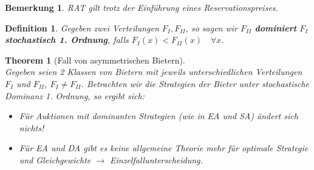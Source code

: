 \documentclass[12pt]{extreport} %
\theoremstyle{named}
\newtheorem{unnamedtheorem}{Theorem} \counterwithin{unnamedtheorem}{chapter}
\theoremstyle{itshape}
\newtheorem*{definition}{Definition}
\theoremstyle{normal}
\newtheorem*{bemerkung}{Bemerkung}
\begin{document}
\begin{bemerkung}
	RAT gilt trotz der Einführung eines Reservationspreises.
\end{bemerkung}

\begin{definition}
	Gegeben zwei Verteilungen $F_{I}, F_{II}$, so sagen wir $F_{II}$ \textbf{dominiert} $F_{I}$ \textbf{stochastisch 1. Ordnung}, falls $F_{I}(x) < F_{II}(x) \quad \forall x$.
\end{definition}

\begin{unnamedtheorem}[Fall von asymmetrischen Bietern] ~\\
	Gegeben seien 2 Klassen von Bietern mit jeweils unterschiedlichen Verteilungen $F_{I}$ und $F_{II}$, $F_{I} \neq F_{II}$. Betrachten wir die Strategien der Bieter unter stochastische Dominanz 1. Ordnung, so ergibt sich:
	\begin{itemize}
		\item Für Auktionen mit dominanten Strategien (wie in EA und SA) ändert sich nichts! 
		\item Für EA und DA gibt es keine allgemeine Theorie mehr für optimale Strategie und Gleichgewichte $\rightarrow$ Einzelfallunterscheidung.
	\end{itemize}	
\end{unnamedtheorem}
\end{document}
